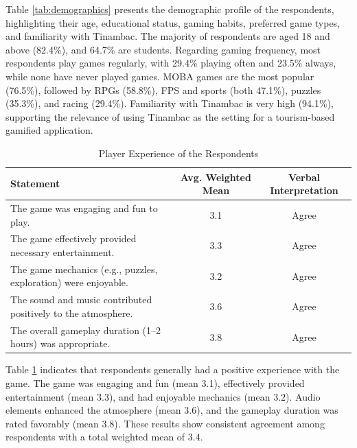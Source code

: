 \documentclass{research}
\begin{document}
Table \ref{tab:demographics} presents the demographic profile of the respondents,
highlighting their age, educational status, gaming habits, preferred game types, and
familiarity with Tinambac. The majority of respondents are aged 18 and above (82.4\%),
and 64.7\% are students. Regarding gaming frequency, most respondents play games
regularly, with 29.4\% playing often and 23.5\% always, while none have never played
games. MOBA games are the most popular (76.5\%), followed by RPGs (58.8\%), FPS and
sports (both 47.1\%), puzzles (35.3\%), and racing (29.4\%). Familiarity with Tinambac
is very high (94.1\%), supporting the relevance of using Tinambac as the setting for a
tourism-based gamified application.



\begin{table}[h!]
\centering
\caption{Player Experience of the Respondents}
\label{tab:player_experience}
\begin{tabularx}{\textwidth}{Xcc}
\toprule
\textbf{Statement} & \textbf{Avg. Weighted Mean} & \textbf{Verbal Interpretation} \\
\midrule
The game was engaging and fun to play. & 3.1 & Agree \\[0.3em]
The game effectively provided necessary entertainment. & 3.3 & Agree \\[0.3em]
The game mechanics (e.g., puzzles, exploration) were enjoyable. & 3.2 & Agree \\[0.3em]
The sound and music contributed positively to the atmosphere. & 3.6 & Agree \\[0.3em]
The overall gameplay duration (1--2 hours) was appropriate. & 3.8 & Agree \\
\bottomrule
\end{tabularx}
\end{table}

Table \ref{tab:player_experience} indicates that respondents generally had a positive
experience with the game. The game was engaging and fun (mean 3.1), effectively
provided entertainment (mean 3.3), and had enjoyable mechanics (mean 3.2). Audio
elements enhanced the atmosphere (mean 3.6), and the gameplay duration was rated
favorably (mean 3.8). These results show consistent agreement among respondents with a
total weighted mean of 3.4.


\end{document}
